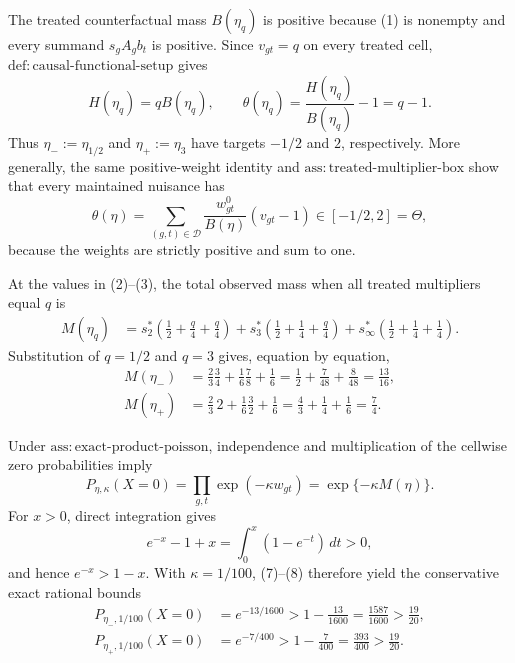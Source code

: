 The treated counterfactual mass \(B(\eta_q)\) is positive because (1) is nonempty and every summand \(s_gA_gb_t\) is positive. Since \(v_{gt}=q\) on every treated cell, \(\mathrm{def{:}causal\text{-}functional\text{-}setup}\) gives
\[
 H(\eta_q)=qB(\eta_q),\qquad
 \theta(\eta_q)=\frac{H(\eta_q)}{B(\eta_q)}-1=q-1.
\tag{4}
\]
Thus \(\eta_-:=\eta_{1/2}\) and \(\eta_+:=\eta_3\) have targets \(-1/2\) and \(2\), respectively. More generally, the same positive-weight identity and \(\mathrm{ass{:}treated\text{-}multiplier\text{-}box}\) show that every maintained nuisance has
\[
 \theta(\eta)=\sum_{(g,t)\in\mathcal D}
 \frac{w^0_{gt}}{B(\eta)}(v_{gt}-1)\in[-1/2,2]=\Theta,
\tag{5}
\]
because the weights are strictly positive and sum to one.

At the values in (2)--(3), the total observed mass when all treated multipliers equal \(q\) is
\[
 \begin{aligned}
 M(\eta_q)
 &=s^*_2\left(\frac12+\frac q4+\frac q4\right)
   +s^*_3\left(\frac12+\frac14+\frac q4\right)
   +s^*_{\infty}\left(\frac12+\frac14+\frac14\right).
 \end{aligned}
\tag{6}
\]
Substitution of \(q=1/2\) and \(q=3\) gives, equation by equation,
\[
 \begin{aligned}
 M(\eta_-)
 &=\frac23\frac34+\frac16\frac78+\frac16
 =\frac12+\frac7{48}+\frac8{48}=\frac{13}{16},\\
 M(\eta_+)
 &=\frac23\,2+\frac16\frac32+\frac16
 =\frac43+\frac14+\frac16=\frac74.
 \end{aligned}
\tag{7}
\]

Under \(\mathrm{ass{:}exact\text{-}product\text{-}poisson}\), independence and multiplication of the cellwise zero probabilities imply
\[
 P_{\eta,\kappa}(X=0)
 =\prod_{g,t}\exp(-\kappa w_{gt})
 =\exp\{-\kappa M(\eta)\}.
\tag{8}
\]
For \(x>0\), direct integration gives
\[
 e^{-x}-1+x=\int_0^x(1-e^{-t})\,dt>0,
\]
and hence \(e^{-x}>1-x\). With \(\kappa=1/100\), (7)--(8) therefore yield the conservative exact rational bounds
\[
 \begin{aligned}
 P_{\eta_-,1/100}(X=0)
 &=e^{-13/1600}>1-\frac{13}{1600}
 =\frac{1587}{1600}>\frac{19}{20},\\
 P_{\eta_+,1/100}(X=0)
 &=e^{-7/400}>1-\frac7{400}
 =\frac{393}{400}>\frac{19}{20}.
 \end{aligned}
\tag{9}
\]

